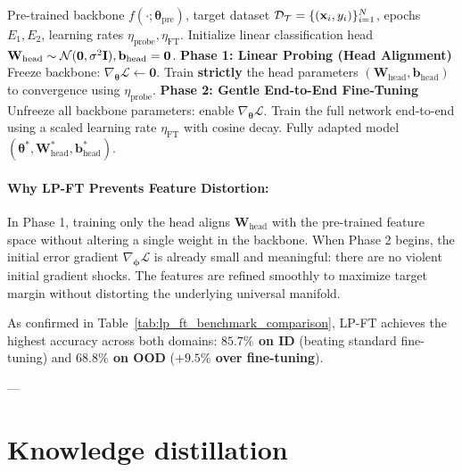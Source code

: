 \begin{algorithm}[H]
\caption{The 2-Step LP-FT Adaptation Protocol}
\label{alg:lp_ft}
\begin{algorithmic}[1]
\Require Pre-trained backbone $f(\cdot; \boldsymbol{\theta}_{\text{pre}})$, target dataset $\mathcal{D}_{\mathcal{T}} = \{(\mathbf{x}_i, y_i)\}_{i=1}^N$, epochs $E_1, E_2$, learning rates $\eta_{\text{probe}}, \eta_{\text{FT}}$.
\State Initialize linear classification head $\mathbf{W}_{\text{head}} \sim \mathcal{N}(\mathbf{0}, \sigma^2 \mathbf{I}), \mathbf{b}_{\text{head}} = \mathbf{0}$.
\State \textbf{Phase 1: Linear Probing (Head Alignment)}
\State Freeze backbone: $\nabla_{\boldsymbol{\theta}} \mathcal{L} \leftarrow \mathbf{0}$.
  \State Train \textbf{strictly} the head parameters $(\mathbf{W}_{\text{head}}, \mathbf{b}_{\text{head}})$ to convergence using $\eta_{\text{probe}}$.
\EndFor
\State {}
\State \textbf{Phase 2: Gentle End-to-End Fine-Tuning}
\State Unfreeze all backbone parameters: enable $\nabla_{\boldsymbol{\theta}} \mathcal{L}$.
  \State Train the full network end-to-end using a scaled learning rate $\eta_{\text{FT}}$ with cosine decay.
\EndFor
\State \Return Fully adapted model $(\boldsymbol{\theta}^*, \mathbf{W}_{\text{head}}^*, \mathbf{b}_{\text{head}}^*)$.
\end{algorithmic}
\end{algorithm}

\paragraph{Why LP-FT Prevents Feature Distortion:}
In Phase 1, training only the head aligns $\mathbf{W}_{\text{head}}$ with the pre-trained feature space without altering a single weight in the backbone. When Phase 2 begins, the initial error gradient $\nabla_{\boldsymbol{\phi}} \mathcal{L}$ is already small and meaningful: there are no violent initial gradient shocks. The features are refined smoothly to maximize target margin without distorting the underlying universal manifold.

As confirmed in Table~\ref{tab:lp_ft_benchmark_comparison}, LP-FT achieves the highest accuracy across both domains: \textbf{$85.7\%$ on ID} (beating standard fine-tuning) and \textbf{$68.8\%$ on OOD} (\textbf{$+9.5\%$ over fine-tuning}).

---

\section{Knowledge distillation}
\label{sec:knowledge_distillation}

